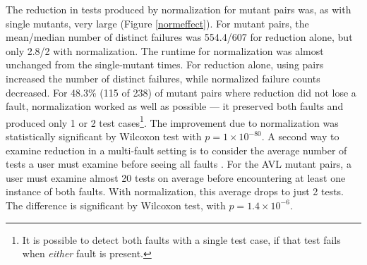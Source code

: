 The reduction in tests produced by normalization for mutant pairs
was, as with single mutants, very large (Figure \ref{normeffect}).
For mutant pairs, the mean/median number of distinct failures was
554.4/607 for reduction alone, but only 2.8/2 with
normalization.  The runtime for normalization was almost
unchanged from the single-mutant times.  For reduction
alone, using pairs increased the number of distinct failures, while
normalized failure counts decreased.  For 48.3\% (115 of 238) of
mutant pairs where reduction did not lose a fault, normalization
worked as well as possible --- it preserved both faults and produced only 1 or 2 test
cases\footnote{It is possible to detect both faults with a single test
  case, if that test fails when \emph{either} fault is
  present.}.  The improvement due to normalization was
statistically significant by Wilcoxon test with $p=1\times10^{-80}$.
A second way to examine reduction in a multi-fault setting is to
consider the average number of tests a user must examine before seeing
all faults \cite{PLDI13}.  For the AVL mutant pairs, a user must
examine almost 20 tests on average before encountering at least
one instance of both faults.  With normalization, this average drops
to just 2 tests.  The difference is significant by Wilcoxon
test, with $p=1.4\times10^{-6}$.

